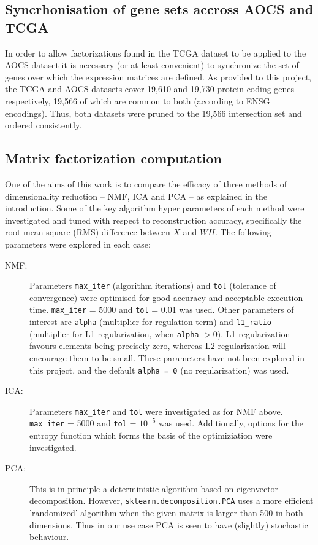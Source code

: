 \documentclass[tikz, 11pt,a4paper,oneside,fleqn]{article}
\begin{document}
\subsection{Syncrhonisation of gene sets accross AOCS and TCGA}
\label{sec:gene-set-intersection}

In order to allow factorizations found in the TCGA dataset to be applied to the AOCS dataset it is necessary (or at least convenient) to synchronize the set of genes over which the expression matrices are defined.   As provided to this project, the TCGA and AOCS datasets cover 19,610 and 19,730 protein coding genes respectively, 19,566 of which are common to both (according to ENSG encodings).  Thus, both datasets were pruned to the 19,566 intersection set and ordered consistently.

\subsection{Matrix factorization computation}
One of the aims of this work is to compare the efficacy of three methods of dimensionality reduction -- NMF, ICA and PCA -- as explained in the introduction.     
Some of the key algorithm hyper parameters of each method were investigated and tuned with respect to reconstruction accuracy, specifically the root-mean square (RMS) difference between $X$ and $W H$. The following parameters were explored in each case:
\begin{description}
\item[NMF:] Parameters {\tt max\_iter} (algorithm iterations) and {\tt tol} (tolerance of convergence) were optimised for good accuracy and acceptable execution time.   
{\tt max\_iter} = 5000 and {\tt tol} = 0.01 was used.
Other parameters of interest are {\tt alpha} (multiplier for regulation term) and {\tt l1\_ratio} (multiplier for L1 regularization, when {\tt alpha} $> 0$).  L1 regularization  favours elements being precisely zero, whereas L2 regularization will encourage them to be small.  These parameters have not been explored in this project, and the default {\tt alpha = 0} (no regularization) was used.
\item[ICA:]  Parameters {\tt max\_iter} and {\tt tol} were investigated as for NMF above. 
{\tt max\_iter} = 5000 and {\tt tol} = $10^{-5}$ was used.
Additionally, options for the entropy function which forms the basis of the optimiziation were investigated.
\item[PCA:] This is in principle a deterministic algorithm based on eigenvector decomposition.  However, {\tt sklearn.decomposition.PCA} uses a more efficient 'randomized' algorithm when the given matrix is larger than 500 in both dimensions.  Thus in our use case PCA is seen to have (slightly) stochastic behaviour.
\end{description}
\end{document}
